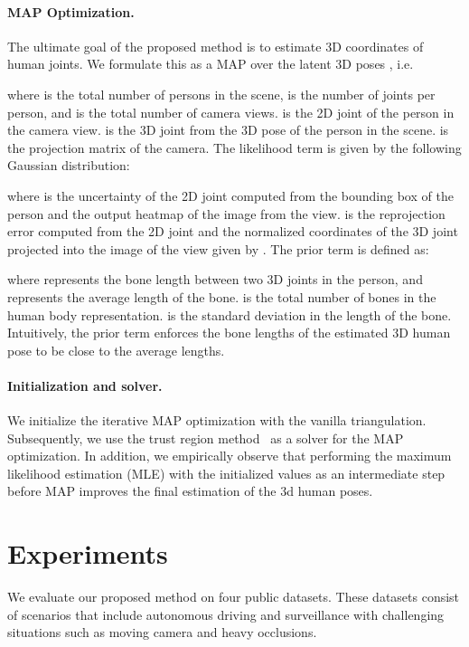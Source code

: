 \documentclass[runningheads]{llncs}
\begin{document}
\paragraph{\bf{MAP Optimization.}}\label{sec:section_three} The ultimate goal of the proposed method is to estimate 3D coordinates of human joints. We formulate this as a MAP over the latent 3D poses , i.e.

where  is the total number of persons in the scene,  is the number of joints per person, and  is the total number of camera views.  is the  2D joint of the  person in the  camera view.  is the  3D joint from the 3D pose  of the  person in the scene.  is the projection matrix of the  camera. The likelihood term is given by the following Gaussian distribution:

where  is the uncertainty of the  2D joint  computed from the bounding box  of the  person and the output heatmap of the image from the  view.  is the reprojection error computed from the 2D joint  and the normalized coordinates of the 3D joint  projected into the image of the  view given by . The prior term is defined as: 

where  represents the  bone length between two 3D joints in the  person, and  represents the average length of the  bone.  is the total number of bones in the human body representation.  is the standard deviation in the length of the  bone. Intuitively, the prior term enforces the bone lengths of the estimated 3D human pose to be close to the average lengths.


\paragraph {\bf{Initialization and solver.}} We initialize the iterative MAP optimization with the vanilla triangulation. Subsequently, we use the trust region method~\cite{conn2000trust} as a solver for the MAP optimization.  In addition, we empirically observe that performing the maximum likelihood estimation (MLE) with the initialized values as an intermediate step before MAP improves the final estimation of the 3d human poses.


\section{Experiments}
We evaluate our proposed method on four public datasets. These datasets consist of scenarios that include autonomous driving and surveillance with challenging situations such as moving camera and heavy occlusions.
\end{document}
